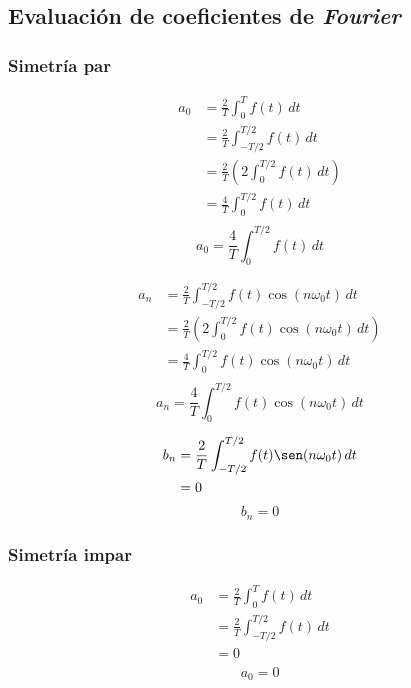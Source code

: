 \subsection{Evaluación de coeficientes de \emph{Fourier}}

\subsubsection{Simetría par}
\begin{equation*}
\begin{split}
    a_0
        &=\frac{2}{T}\int_0^T f(t)\,dt\\
        &=\frac{2}{T}\int_{-T/2}^{T/2} f(t)\,dt\\
        &=\frac{2}{T}\left(2\int_0^{T/2} f(t)\,dt\right)\\
        &=\frac{4}{T}\int_0^{T/2} f(t)\,dt\\
\end{split}
\end{equation*}
\begin{equation}
    a_0=\frac{4}{T}\int_0^{T/2} f(t)\,dt
\end{equation}

\begin{equation*}
\begin{split}
    a_n
        &=\frac{2}{T}\int_{-T/2}^{T/2} f(t)\cos(n\omega_0 t)\,dt\\
        &=\frac{2}{T}\left(2\int_0^{T/2} f(t)\cos(n\omega_0 t)\,dt\right)\\
        &=\frac{4}{T}\int_0^{T/2}f(t)\cos(n\omega_0 t)\,dt\\
\end{split}
\end{equation*}
\begin{equation}
    a_n=\frac{4}{T}\int_0^{T/2}f(t)\cos(n\omega_0 t)\,dt
\end{equation}

\begin{equation*}
\begin{split}
    b_n
        &=\frac{2}{T}\int_{-T/2}^{T/2} f(t)\sen(n\omega_0 t)\,dt\\
        &=0\\
\end{split}
\end{equation*}
\begin{equation}
    b_n=0
\end{equation}

\subsubsection{Simetría impar}
\begin{equation*}
\begin{split}
    a_0
        &=\frac{2}{T}\int_0^T f(t)\,dt\\
        &=\frac{2}{T}\int_{-T/2}^{T/2} f(t)\,dt\\
        &=0\\
\end{split}
\end{equation*}
\begin{equation}
    a_0=0
\end{equation}

